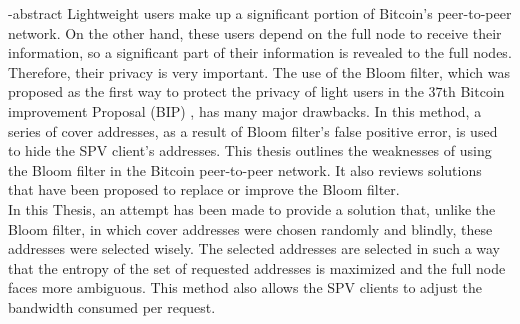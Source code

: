 
\en-abstract{
Lightweight users make up a significant portion of Bitcoin's peer-to-peer network. On the other hand, these users depend on the full node to receive their information, so a significant part of their information is revealed to the full nodes. Therefore, their privacy is very important. The use of the Bloom filter, which was proposed as the first way to protect the privacy of light users in the $37$th Bitcoin improvement Proposal (BIP) , has many major drawbacks. In this method, a series of cover addresses, as a result of Bloom filter's false positive error, is used to hide the SPV client's addresses. This thesis outlines the weaknesses of using the Bloom filter in the Bitcoin peer-to-peer network. It also reviews solutions that have been proposed to replace or improve the Bloom filter.\\
In this Thesis, an attempt has been made to provide a solution that, unlike the Bloom filter, in which cover addresses were chosen randomly and blindly, these addresses were selected wisely.  The selected addresses are selected in such a way that the entropy of the set of requested addresses is maximized and the full node faces more ambiguous. This method also allows the SPV clients to adjust the bandwidth consumed per request.}
